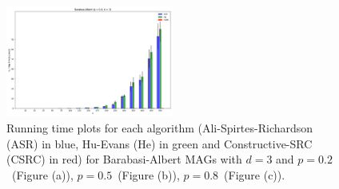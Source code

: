 \documentclass[a4paper]{article}
\begin{document}
\begin{figure}[htbp]
	\centering
	\hfill
	
	\includegraphics[width=0.49\textwidth]{figures/Figure_21.png}
	
	\caption{Running time plots for each algorithm (Ali-Spirtes-Richardson (ASR) in blue, Hu-Evans (He) in green and Constructive-SRC (CSRC) in red) for Barabasi-Albert MAGs with $d=3$ and $p=0.2$~(Figure (a)), $p=0.5$~(Figure (b)), $p=0.8$~(Figure (c)).}
	\label{fig:sf-3-ap}
\end{figure}
\end{document}
